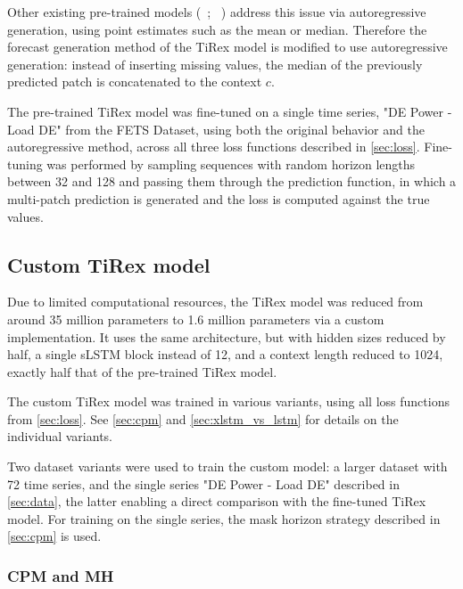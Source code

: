 \documentclass[a4paper,oneside,10pt,ngerman,english]{scrartcl}
\begin{document}
Other existing pre-trained models (\citeauthor{das2024decoderonlyfoundationmodeltimeseries}~\cite{das2024decoderonlyfoundationmodeltimeseries}; \citeauthor{ansari2024fast}~\cite{ansari2024fast}) address this issue via autoregressive generation, using point estimates such as the mean or median. Therefore the forecast generation method of the TiRex model is modified to use autoregressive generation: instead of inserting missing values, the median of the previously predicted patch is concatenated to the context $c$.

The pre-trained TiRex model was fine-tuned on a single time series, "DE Power - Load DE" from the FETS Dataset, using both the original behavior and the autoregressive method, across all three loss functions described in \autoref{sec:loss}. Fine-tuning was performed by sampling sequences with random horizon lengths between 32 and 128 and passing them through the prediction function, in which a multi-patch prediction is generated and the loss is computed against the true values.

\subsection{Custom TiRex model}
\label{sec:custom_tirex}

Due to limited computational resources, the TiRex model was reduced from around 35 million parameters to 1.6 million parameters via a custom implementation. It uses the same architecture, but with hidden sizes reduced by half, a single sLSTM block instead of 12, and a context length reduced to 1024, exactly half that of the pre-trained TiRex model.

The custom TiRex model was trained in various variants, using all loss functions from \autoref{sec:loss}. See \autoref{sec:cpm} and \autoref{sec:xlstm_vs_lstm} for details on the individual variants.

Two dataset variants were used to train the custom model: a larger dataset with 72 time series, and the single series "DE Power - Load DE" described in \autoref{sec:data}, the latter enabling a direct comparison with the fine-tuned TiRex model. For training on the single series, the mask horizon strategy described in \autoref{sec:cpm} is used.

\subsubsection{CPM and MH}
\label{sec:cpm}
 
\end{document}
